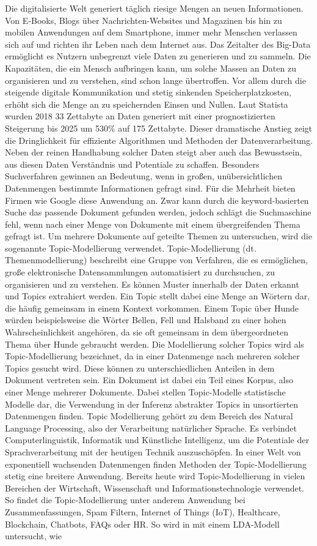 \documentclass[german,version-2020-11]{uzl-thesis}
\begin{document}
Die digitalisierte Welt generiert täglich riesige Mengen an neuen Informationen. Von E-Books, Blogs über Nachrichten-Websites und Magazinen bis hin zu mobilen Anwendungen auf dem Smartphone, immer mehr Menschen verlassen sich auf und richten ihr Leben nach dem Internet aus. Das Zeitalter des Big-Data ermöglicht es Nutzern unbegrenzt viele Daten zu generieren und zu sammeln. Die Kapazitäten, die ein Mensch aufbringen kann, um solche Massen an Daten zu organisieren und zu verstehen, sind schon lange übertroffen. Vor allem durch die steigende digitale Kommunikation und stetig sinkenden Speicherplatzkosten, erhöht sich die Menge an zu speichernden Einsen und Nullen. Laut Statista \cite{statista}  wurden 2018 33 Zettabyte an Daten generiert mit einer prognostizierten Steigerung bis 2025 um 530\% auf 175 Zettabyte. Dieser dramatische Anstieg zeigt die Dringlichkeit für effiziente Algorithmen und Methoden der Datenverarbeitung. Neben der reinen Handhabung solcher Daten steigt aber auch das Bewusstsein, aus diesen Daten Verständnis und Potentiale zu schaffen. Besonders Suchverfahren gewinnen an Bedeutung, wenn in großen, unübersichtlichen Datenmengen bestimmte Informationen gefragt sind. Für die Mehrheit bieten Firmen wie Google diese Anwendung an. Zwar kann durch die keyword-basierten Suche das passende Dokument gefunden werden, jedoch schlägt die Suchmaschine fehl, wenn nach einer Menge von Dokumente mit einem übergreifenden Thema gefragt ist. Um mehrere Dokumente auf geteilte Themen zu untersuchen, wird die sogenannte Topic-Modellierung verwendet. Topic-Modellierung (dt. Themenmodellierung) beschreibt eine Gruppe von Verfahren, die es ermöglichen, große elektronische Datensammlungen automatisiert zu durchsuchen, zu organisieren und zu verstehen. Es können Muster innerhalb der Daten erkannt und Topics extrahiert werden. Ein Topic stellt dabei eine Menge an Wörtern dar, die häufig gemeinsam in einem Kontext vorkommen. Einem Topic über Hunde würden beispielsweise die Wörter Bellen, Fell und Halsband zu einer hohen Wahrscheinlichkeit angehören, da sie oft gemeinsam in dem übergeordneten Thema über Hunde gebraucht werden. Die Modellierung solcher Topics wird als Topic-Modellierung bezeichnet, da in einer Datenmenge nach mehreren solcher Topics gesucht wird. Diese können zu unterschiedlichen Anteilen in dem Dokument vertreten sein. Ein Dokument ist dabei ein Teil eines Korpus, also einer Menge mehrerer Dokumente. Dabei stellen Topic-Modelle statistische Modelle dar, die Verwendung in der Inferenz abstrakter Topics in unsortierten Datenmengen finden. Topic Modellierung gehört zu dem Bereich des Natural Language Processing, also der Verarbeitung natürlicher Sprache. Es verbindet Computerlinguistik, Informatik und Künstliche Intelligenz, um die Potentiale der Sprachverarbeitung mit der heutigen Technik auszuschöpfen. In einer Welt von exponentiell wachsenden Datenmengen finden Methoden der Topic-Modellierung stetig eine breitere Anwendung. Bereits heute wird Topic-Modellierung in vielen Bereichen der Wirtschaft, Wissenschaft und Informationstechnologie verwendet. So findet die Topic-Modellierung unter anderem Anwendung bei Zusammenfassungen, Spam Filtern, Internet of Things (IoT), Healthcare, Blockchain, Chatbots, FAQs oder HR. So wird in \cite{a1} mit einem LDA-Modell untersucht, wie 
\end{document}
